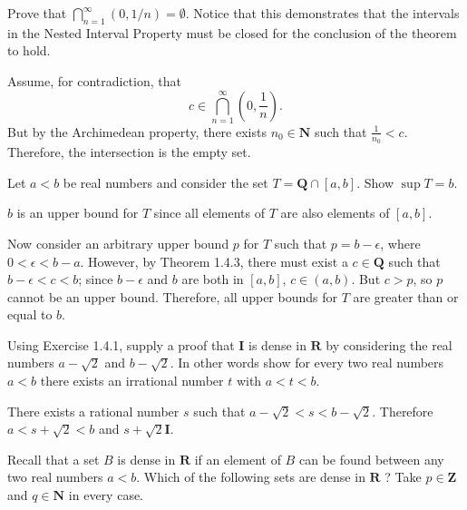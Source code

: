 \begin{exercise}
  Prove that $\bigcap_{n=1}^{\infty}(0,1 / n)=\emptyset$. Notice that this demonstrates that the intervals in the Nested Interval Property must be closed for the conclusion of the theorem to hold.
\end{exercise}

\begin{solution}
  Assume, for contradiction, that $$c\in\bigcap^\infty_{n=1} \left( 0, \frac{1}{n}\right).$$ But by the Archimedean property, there exists $n_0\in\mathbf{N}$ such that $\frac{1}{n_0}<c$. Therefore, the intersection is the empty set.
\end{solution}


\begin{exercise}
  Let $a<b$ be real numbers and consider the set $T=\mathbf{Q} \cap[a, b]$. Show $\sup T=b$.
\end{exercise}

\begin{solution}
  $b$ is an upper bound for $T$ since all elements of $T$ are also elements of $[a, b]$.

  Now consider an arbitrary upper bound $p$ for $T$ such that $p=b-\epsilon$, where $0<\epsilon<b-a$. However, by Theorem 1.4.3, there must exist a $c\in\mathbf{Q}$ such that $b-\epsilon<c<b$; since $b-\epsilon$ and $b$ are both in $[a,b]$, $c\in (a, b)$. But $c>p$, so $p$ cannot be an upper bound. Therefore, all upper bounds for $T$ are greater than or equal to $b$.
\end{solution}

\begin{exercise}
  Using Exercise 1.4.1, supply a proof that $\mathbf{I}$ is dense in $\mathbf{R}$ by considering the real numbers $a-\sqrt{2}$ and $b-\sqrt{2}$. In other words show for every two real numbers $a<b$ there exists an irrational number $t$ with $a<t<b$.
\end{exercise}

\begin{solution}
  There exists a rational number $s$ such that $a-\sqrt2 <s<b-\sqrt2$. Therefore $a<s+\sqrt2 <b$ and $s+\sqrt2 \mathbf{I}$.
\end{solution}

\begin{exercise}
  Recall that a set $B$ is dense in $\mathbf{R}$ if an element of $B$ can be found between any two real numbers $a<b$. Which of the following sets are dense in $\mathbf{R}$ ? Take $p \in \mathbf{Z}$ and $q \in \mathbf{N}$ in every case.
\end{exercise}


